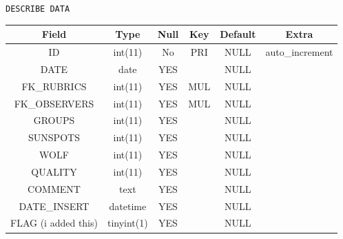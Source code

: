 \documentclass[12pt]{article}
\begin{document}
{\centering
    \caption{\texttt{DESCRIBE DATA}}
    \begin{tabular}{c|c|c|c|c|c}%
        \textbf{Field} & \textbf{Type} & \textbf{Null} & \textbf{Key} & \textbf{Default} & \textbf{Extra}  \\
        \hline
        ID & int(11) & No & PRI & NULL & auto\_increment \\
        
        DATE & date & YES && NULL & \\
        
        FK\_RUBRICS & int(11) & YES & MUL & NULL &  \\
        
        FK\_OBSERVERS & int(11) & YES & MUL & NULL &  \\
        
        GROUPS & int(11) & YES && NULL &  \\
        
        SUNSPOTS & int(11) & YES && NULL & \\
        
        WOLF & int(11) & YES && NULL &  \\
        
        QUALITY & int(11) & YES && NULL &  \\
        
        COMMENT & text & YES && NULL &  \\
        
        DATE\_INSERT & datetime & YES && NULL &  \\
        
        FLAG (i added this) & tinyint(1) & YES && NULL &  \\
        
    \end{tabular}
    \label{tab:data-og}
\par}\\
\end{document}
